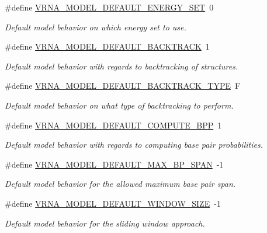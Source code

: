 \begin{DoxyCompactItemize}
\#define \hyperlink{group__model__details_ga6fcf6b2d0f89256cdbd166486c9b6e1e}{V\+R\+N\+A\+\_\+\+M\+O\+D\+E\+L\+\_\+\+D\+E\+F\+A\+U\+L\+T\+\_\+\+E\+N\+E\+R\+G\+Y\+\_\+\+S\+ET}~0
\begin{DoxyCompactList}\small\item\em Default model behavior on which energy set to use. \end{DoxyCompactList}\item 
\#define \hyperlink{group__model__details_ga3fda8006ab84baf817bd8e5ccbc6bb35}{V\+R\+N\+A\+\_\+\+M\+O\+D\+E\+L\+\_\+\+D\+E\+F\+A\+U\+L\+T\+\_\+\+B\+A\+C\+K\+T\+R\+A\+CK}~1
\begin{DoxyCompactList}\small\item\em Default model behavior with regards to backtracking of structures. \end{DoxyCompactList}\item 
\#define \hyperlink{group__model__details_gad0e81fcaca53c4a826c68e0796de2afb}{V\+R\+N\+A\+\_\+\+M\+O\+D\+E\+L\+\_\+\+D\+E\+F\+A\+U\+L\+T\+\_\+\+B\+A\+C\+K\+T\+R\+A\+C\+K\+\_\+\+T\+Y\+PE}~\textquotesingle{}F\textquotesingle{}
\begin{DoxyCompactList}\small\item\em Default model behavior on what type of backtracking to perform. \end{DoxyCompactList}\item 
\#define \hyperlink{group__model__details_ga1d6cd5051940b126c248147c011bac6c}{V\+R\+N\+A\+\_\+\+M\+O\+D\+E\+L\+\_\+\+D\+E\+F\+A\+U\+L\+T\+\_\+\+C\+O\+M\+P\+U\+T\+E\+\_\+\+B\+PP}~1
\begin{DoxyCompactList}\small\item\em Default model behavior with regards to computing base pair probabilities. \end{DoxyCompactList}\item 
\#define \hyperlink{group__model__details_ga7cb6f4ae8fdebff6746a4410814f2977}{V\+R\+N\+A\+\_\+\+M\+O\+D\+E\+L\+\_\+\+D\+E\+F\+A\+U\+L\+T\+\_\+\+M\+A\+X\+\_\+\+B\+P\+\_\+\+S\+P\+AN}~-\/1
\begin{DoxyCompactList}\small\item\em Default model behavior for the allowed maximum base pair span. \end{DoxyCompactList}\item 
\#define \hyperlink{group__model__details_ga8de04a9cb57e811e313b0f9f207f6bdb}{V\+R\+N\+A\+\_\+\+M\+O\+D\+E\+L\+\_\+\+D\+E\+F\+A\+U\+L\+T\+\_\+\+W\+I\+N\+D\+O\+W\+\_\+\+S\+I\+ZE}~-\/1
\begin{DoxyCompactList}\small\item\em Default model behavior for the sliding window approach. \end{DoxyCompactList}\item 

\end{DoxyCompactItemize}
